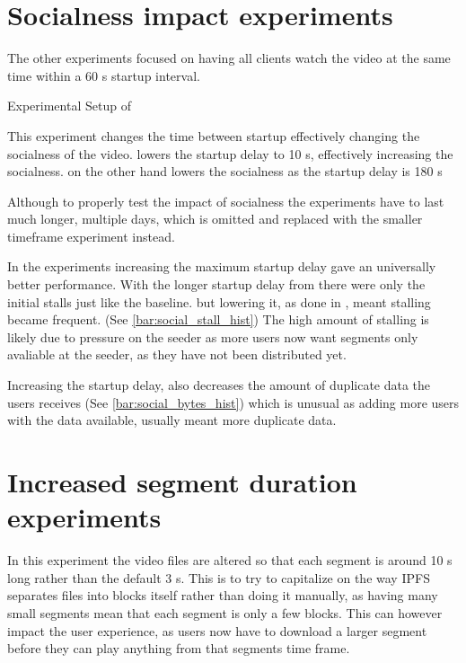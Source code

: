 

\FloatBarrier \section{Socialness impact experiments}
\label{sec:eval_socialness}
The other experiments focused on having all clients watch the video at the same time within a 60 \ac{s} startup interval.

\begin{table}[!htbp]
    \myfloatalign
    \caption[Experimental Setup of Socialness]{Experimental Setup of }
    \label{tab:exp_overview_socialness}
    
\end{table}

This experiment changes the time between startup effectively changing the socialness of the video.  lowers the startup delay to 10 \ac{s}, effectively increasing the socialness.  on the other hand lowers the socialness as the startup delay is 180 \ac{s}

Although to properly test the impact of socialness the experiments have to last much longer, multiple days, which is omitted and replaced with the smaller timeframe experiment instead.

In the experiments increasing the maximum startup delay gave an universally better performance. With the longer startup delay from  there were only the initial stalls just like the baseline. but lowering it, as done in , meant stalling became frequent. (See \autoref{bar:social_stall_hist}) The high amount of stalling is likely due to pressure on the seeder as more users now want segments only avaliable at the seeder, as they have not been distributed yet.

Increasing the startup delay, also decreases the amount of duplicate data the users receives (See \autoref{bar:social_bytes_hist}) which is unusual as adding more users with the data available, usually meant more duplicate data. %




\FloatBarrier \section{Increased segment duration experiments}
\label{sec:eval_segment}

In this experiment the video files are altered so that each segment is around 10 \ac{s} long rather than the default 3 \ac{s}. This is to try to capitalize on the way \ac{IPFS} separates files into blocks itself rather than doing it manually, as having many small segments mean that each segment is only a few blocks. This can however impact the user experience, as users now have to download a larger segment before they can play anything from that segments time frame.

